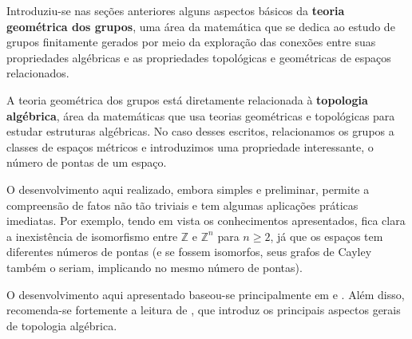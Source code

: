 Introduziu-se nas seções anteriores alguns aspectos básicos da \textbf{teoria geométrica dos grupos}, uma área da matemática que se dedica ao estudo de grupos finitamente gerados por meio da exploração das conexões entre suas propriedades algébricas e as propriedades topológicas e geométricas de espaços relacionados.

A teoria geométrica dos grupos está diretamente relacionada à \textbf{topologia algébrica}, área da matemáticas que usa teorias geométricas e topológicas para estudar estruturas algébricas. No caso desses escritos, relacionamos os grupos a classes de espaços métricos e introduzimos uma propriedade interessante, o número de pontas de um espaço.

O desenvolvimento aqui realizado, embora simples e preliminar, permite a compreensão de fatos não tão triviais e tem algumas aplicações práticas imediatas. Por exemplo, tendo em vista os conhecimentos apresentados, fica clara a inexistência de isomorfismo entre $\mathbb{Z}$ e $\mathbb{Z}^n$ para $n \geq 2$, já que os espaços tem diferentes números de pontas (e se fossem isomorfos, seus grafos de Cayley também o seriam, implicando no mesmo número de pontas).

O desenvolvimento aqui apresentado baseou-se principalmente em \cite{posCur} e \cite{notasGGT}. Além disso, recomenda-se fortemente a leitura de \cite{hatcher}, que introduz os principais aspectos gerais de topologia algébrica.